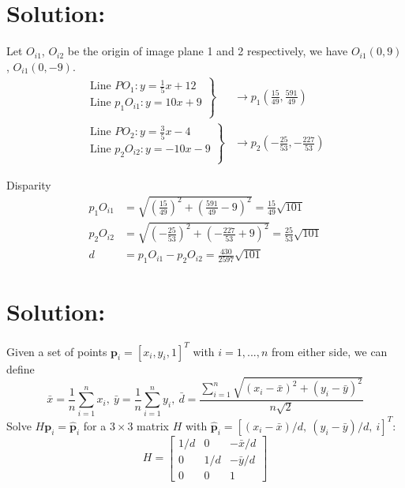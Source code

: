 \documentclass[12pt]{article}
\begin{document}
\section{Solution:}
Let $O_{i1}$, $O_{i2}$ be the origin of image plane 1 and 2 respectively, we have $O_{i1}(0,9)$, $O_{i1}(0, -9)$.
\begin{equation*}  
\begin{aligned}
\left.  
     \begin{array}{cc}  
        \text{Line } PO_1: y = \frac{1}{5}x + 12\\
        \text{Line } p_1O_{i1}: y = 10x + 9\\  
     \end{array}  
\right\}&\to  p_1(\frac{15}{49}, \frac{591}{49})\\
\left.  
     \begin{array}{cc}  
        \text{Line } PO_2: y = \frac{3}{5}x -4 \\
        \text{Line } p_2O_{i2}: y = -10x - 9\\  
     \end{array}  
\right\}&\to  p_2(-\frac{25}{53}, -\frac{227}{53})
\end{aligned}
\end{equation*}  

Disparity
\begin{equation*}
\begin{aligned}
    p_1O_{i1} &= \sqrt{(\frac{15}{49})^2 + (\frac{591}{49} - 9)^2} = \frac{15}{49}\sqrt{101}\\
    p_2O_{i2} &= \sqrt{(-\frac{25}{53})^2 + (-\frac{227}{53} + 9)^2} = \frac{25}{53}\sqrt{101}\\
    d &= p_1O_{i1} - p_2O_{i2} = \frac{430}{2597}\sqrt{101}
\end{aligned}
\end{equation*}

\section{Solution:}
Given a set of points $\textbf{p}_i = [x_i, y_i, 1]^T$ with $i = 1, ..., n$ from either side, we can define
\begin{equation*}
    \bar{x} = \frac{1}{n}\sum_{i=1}^nx_i,\ \bar{y} = \frac{1}{n}\sum_{i=1}^ny_i,\ \bar{d} = \frac{\sum_{i=1}^n\sqrt{(x_i - \bar{x})^2 + (y_i - \bar{y})^2 }}{n\sqrt{2}}
\end{equation*}
Solve $H\textbf{p}_i = \hat{\textbf{p}}_i$ for a $3\times3$ matrix $H$ with $\hat{\textbf{p}}_i = [(x_i - \bar{x})/d,\ (y_i - \bar{y})/d,\ i]^T$:
\begin{equation*}
H = \left[ \begin{array}{ccc}
1/d & 0 & -\bar{x}/d \\
0 & 1/d & -\bar{y}/d \\
0 & 0 & 1
\end{array} \right]
\end{equation*}
\end{document}

